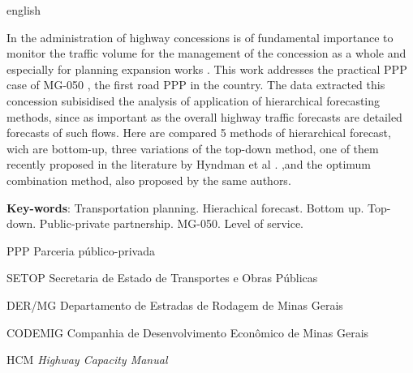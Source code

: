 \documentclass[
	12pt,				%
	openright,			%
	twoside,			%
	a4paper,			%
	english,			%
	french,				%
	spanish,			%
	brazil				%
	]{abntex2}
\begin{document}
\begin{resumo}[Abstract]
 \begin{otherlanguage*}{english}

In the administration of highway concessions is of fundamental importance to monitor the traffic volume for the management of the concession as a whole and especially for planning expansion works . This work addresses the practical PPP case of MG-050 , the first road PPP in the country. The data extracted this concession subisidised the analysis of application of hierarchical forecasting methods, since as important as the overall highway traffic forecasts are detailed forecasts of such flows.
Here are compared 5 methods of hierarchical forecast, wich are  bottom-up, three variations of the top-down method, one of them recently proposed in the literature by Hyndman et al . ,and the optimum combination method, also proposed by the same authors.


   \vspace{\onelineskip}
 
   \noindent 
   \textbf{Key-words}: Transportation planning. Hierachical forecast. Bottom up. Top-down. Public-private partnership. MG-050. Level of service.
 \end{otherlanguage*}
\end{resumo}


\listoffigures*
\cleardoublepage

\listoftables*
\cleardoublepage

\begin{siglas}
 \item[PPP] Parceria público-privada
 \item[SETOP] Secretaria de Estado de Transportes e Obras Públicas
 \item[DER/MG] Departamento de Estradas de Rodagem de Minas Gerais 
 \item[CODEMIG] Companhia de Desenvolvimento Econômico de Minas Gerais
 \item[HCM] \emph{Highway Capacity Manual}

\end{siglas}

\end{document}
